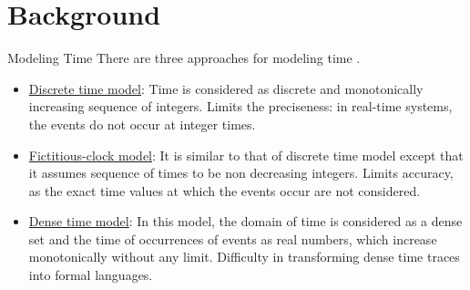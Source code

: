 \documentclass[10pt]{beamer}
\theoremstyle{plain}
\theoremstyle{definition}
\begin{document}
\section{Background}


\begin{frame}{Modeling Time}
	There are three approaches for modeling time \cite{Alur:1994:TTA:180782.180519}.
		\begin{itemize}		
		\item \underline{Discrete time model}: Time is considered as discrete and monotonically increasing sequence of integers. Limits the preciseness: in real-time systems, the events do not occur at integer times.
		\item \underline{Fictitious-clock model}: It is similar to that of discrete time model except that it assumes sequence of times to be non decreasing integers. Limits accuracy, as the exact time values at which the events occur are not considered. 
		\item \underline{Dense time model}: In this model, the domain of time is considered as a dense set and the time of occurrences of events as real numbers, which increase monotonically without any limit. Difficulty in transforming dense time traces into formal languages.
	\end{itemize}
\end{frame}
\end{document}
